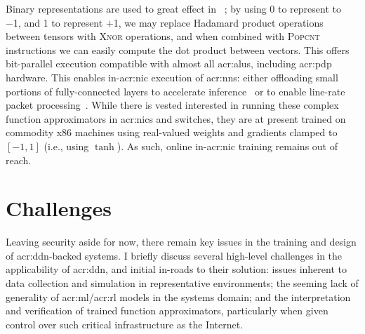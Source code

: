 Binary representations are used to great effect in ~\parencite{DBLP:journals/corr/MiyashitaLM16,DBLP:conf/eccv/RastegariORF16,DBLP:journals/corr/KimS16,DBLP:conf/nips/HubaraCSEB16}; by using 0 to represent to \num{-1}, and 1 to represent $+$\num{1}, we may replace Hadamard product operations between tensors with \textsc{Xnor} operations, and when combined with \textsc{Popcnt} instructions we can easily compute the dot product between vectors.
This offers bit-parallel execution compatible with almost all \glspl{acr:alu}, including \gls{acr:pdp} hardware.
This enables in-\gls{acr:nic} execution of \glspl{acr:nn}: either offloading small portions of fully-connected layers to accelerate inference~\parencite{DBLP:conf/sigcomm/SanvitoSB18} or to enable line-rate packet processing~\parencite{DBLP:journals/corr/abs-2009-02353,DBLP:journals/corr/abs-1801-05731}.
While there is vested interested in running these complex function approximators in \glspl{acr:nic} and switches, they are at present trained on commodity x86 machines using real-valued weights and gradients clamped to $\left[-1, 1\right]$ (i.e., using $\tanh$).
As such, online in-\gls{acr:nic} training remains out of reach.

\section{Challenges}\label{sec:ddn-challenges}
Leaving security aside for now, there remain key issues in the training and design of \gls{acr:ddn}-backed systems.
I briefly discuss several high-level challenges in the applicability of \gls{acr:ddn}, and initial in-roads to their solution: issues inherent to data collection and simulation in representative environments; the seeming lack of generality of \gls{acr:ml}/\gls{acr:rl} models in the systems domain; and the interpretation and verification of trained function approximators, particularly when given control over such critical infrastructure as the Internet.

